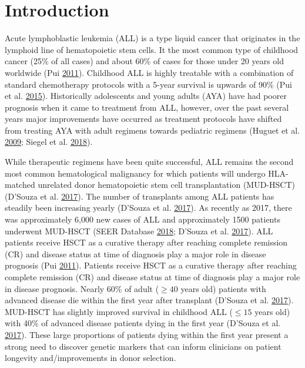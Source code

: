 \documentclass[]{DissertateOSU}
\begin{document}
\doublespacing

\section{Introduction}\label{introduction-4}

Acute lymphoblastic leukemia (ALL) is a type liquid cancer that
originates in the lymphoid line of hematopoietic stem cells. It the most
common type of childhood cancer (25\% of all cases) and about 60\% of
cases for those under 20 years old worldwide (Pui
\protect\hyperlink{ref-pui2011acute}{2011}). Childhood ALL is highly
treatable with a combination of standard chemotherapy protocols with a
5-year survival is upwards of 90\% (Pui et al.
\protect\hyperlink{ref-pui_2015}{2015}). Historically adolescents and
young adults (AYA) have had poorer prognosis when it came to treatment
from ALL, however, over the past several years major improvements have
occurred as treatment protocols have shifted from treating AYA with
adult regimens towards pediatric regimens (Huguet et al.
\protect\hyperlink{ref-Huguet_2009}{2009}; Siegel et al.
\protect\hyperlink{ref-siegel_2018}{2018}).

While therapeutic regimens have been quite successful, ALL remains the
second most common hematological malignancy for which patients will
undergo HLA-matched unrelated donor hematopoietic stem cell
transplantation (MUD-HSCT) (D'Souza et al.
\protect\hyperlink{ref-DSouza_2017}{2017}). The number of transplants
among ALL patients has steadily been increasing yearly (D'Souza et al.
\protect\hyperlink{ref-DSouza_2017}{2017}). As recently as 2017, there
was approximately 6,000 new cases of ALL and approximately 1500 patients
underwent MUD-HSCT (SEER Database \protect\hyperlink{ref-seer}{2018};
D'Souza et al. \protect\hyperlink{ref-DSouza_2017}{2017}). ALL patients
receive HSCT as a curative therapy after reaching complete remission
(CR) and disease status at time of diagnosis play a major role in
disease prognosis (Pui \protect\hyperlink{ref-pui2011acute}{2011}).
Patients receive HSCT as a curative therapy after reaching complete
remission (CR) and disease status at time of diagnosis play a major role
in disease prognosis. Nearly 60\% of adult (\(\geq 40\) years old)
patients with advanced disease die within the first year after
transplant (D'Souza et al. \protect\hyperlink{ref-DSouza_2017}{2017}).
MUD-HSCT has slightly improved survival in childhood ALL (\(\leq 15\)
years old) with 40\% of advanced disease patients dying in the first
year (D'Souza et al. \protect\hyperlink{ref-DSouza_2017}{2017}). These
large proportions of patients dying within the first year present a
strong need to discover genetic markers that can inform clinicians on
patient longevity and/improvements in donor selection.
\end{document}
